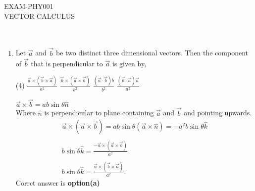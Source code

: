 \begin{abox}
	EXAM-PHY001\\ \vspace{0.6cm}
VECTOR CALCULUS
\end{abox}

\section*{}
$\left. \right.$ {}
\begin{enumerate}[label=\color{ocre}\textbf{\arabic*.}]

\item Let $\vec{a}$ and $\vec{b}$ be two distinct three dimensional vectors. Then the component of $\vec{b}$ that is
perpendicular to $\vec{a}$ is given by,
\begin{tasks}(4)
	\task[\textbf{a.}]$\frac{\vec{a} \times(\vec{b} \times \vec{a})}{a^{2}}$  
	\task[\textbf{b.}]$\frac{\vec{b} \times(\vec{a} \times \vec{b})}{b^{2}}$
	\task[\textbf{c.}]$\frac{(\vec{a} \cdot \vec{b}) b}{b^{2}}$ 
	\task[\textbf{d.}]  $\frac{(\vec{b} \cdot \vec{a}) \vec{a}}{a^{2}}$
\end{tasks}
\begin{answer}
	
	$\vec{a} \times \vec{b}=a b \sin \theta \hat{n}$ \\Where $\hat{n}$ is perpendicular to plane containing
	$\vec{a}$ and $\vec{b}$ and pointing upwards.
	$$
	\begin{array}{l}
	\vec{a} \times(\vec{a} \times \vec{b})=a b \sin \theta(\vec{a} \times \hat{n})=-a^{2} b \sin \theta \hat{k} \\\\
	b \sin \theta \hat{k}=\frac{-\vec{a} \times(\vec{a} \times \vec{b})}{a^{2}} \\\\ b \sin \theta \hat{k}=\frac{\vec{a} \times(\vec{b} \times \vec{a})}{a^{2}} .
	\end{array}
	$$
	Corrct answer is \textbf{option(a)}
\end{answer}
	

\end{enumerate}
